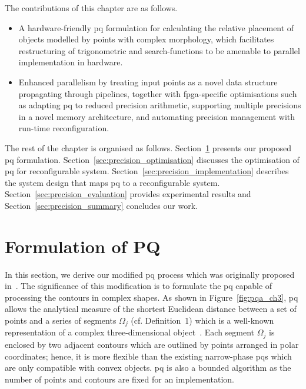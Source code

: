 The contributions of this chapter are as follows.
\begin{itemize}
\item A hardware-friendly \gls{pq} formulation for calculating the relative placement of objects modelled by points with complex morphology, which facilitates
restructuring of trigonometric and search-functions to be amenable to parallel implementation in hardware.
\item Enhanced parallelism by treating input points as a novel data structure propagating through pipelines, 
together with \gls{fpga}-specific optimisations such as adapting \gls{pq} to reduced precision arithmetic,
supporting multiple precisions in a novel memory architecture, and automating precision management with run-time reconfiguration.
\end{itemize}

The rest of the chapter is organised as follows.
Section~\ref{sec:precision_formulation} presents our proposed \gls{pq} formulation.
Section~\ref{sec:precision_optimisation} discusses the optimisation of \gls{pq} for reconfigurable system.
Section~\ref{sec:precision_implementation} describes the system design that maps \gls{pq} to a reconfigurable system.
Section~\ref{sec:precision_evaluation} provides experimental results and
Section~\ref{sec:precision_summary} concludes our work.

\section{Formulation of PQ}
\label{sec:precision_formulation}

In this section, we derive our modified \gls{pq} process which was originally proposed in~\cite{kwok13}. 
The significance of this modification is to formulate the \gls{pq} capable of processing the contours in complex shapes. 
As shown in Figure~\ref{fig:pqa_ch3}, \gls{pq} allows the analytical measure of the shortest Euclidean distance between a set of points and a series of segments $\Omega_j$ (cf. Definition~1) which is a well-known representation of a complex three-dimensional object~\cite{ponce89}. 
Each segment $\Omega_j$ is enclosed by two adjacent contours which are outlined by points arranged in polar coordinates; 
hence, it is more flexible than the existing narrow-phase \gls{pq}s which are only compatible with convex objects.
\gls{pq} is also a bounded algorithm as the number of points and contours are fixed for an implementation.

